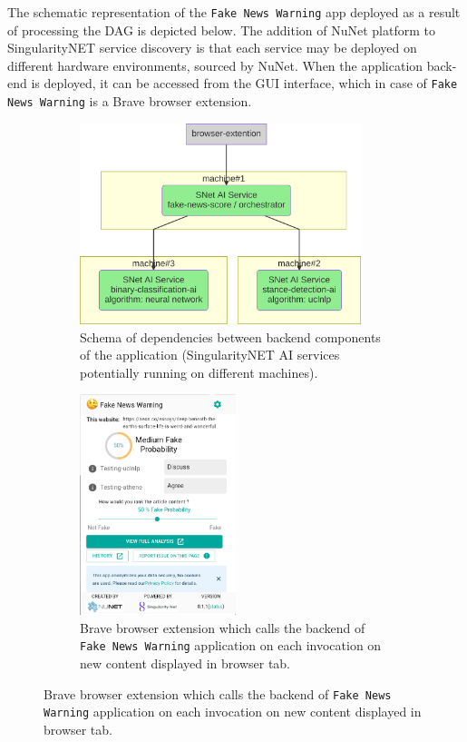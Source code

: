 \documentclass[]{report}
\begin{document}
The schematic representation of the \texttt{Fake News Warning} app deployed as a
result of processing the DAG is depicted below. The addition of NuNet platform
to SingularityNET service discovery is that each service may be deployed on
different hardware environments, sourced by NuNet. When the application back-end
is deployed, it can be accessed from the GUI interface, which in case of
\texttt{Fake News Warning} is a Brave browser extension.

\begin{figure}[H]
  \begin{subfigure}[t]{0.50\textwidth}
    \centering
    \includegraphics[width=0.9\textwidth]{../../../ontology/images/fake_news_detector.png}
    \captionsetup{width=0.8\linewidth}
    \caption{Schema of dependencies between backend components of the application
    (SingularityNET AI services potentially running on different machines).}
    \label{fig:fake_news_detector_schema}
  \end{subfigure}
  \begin{subfigure}[t]{0.50\textwidth}
    \centering
    \includegraphics[width=0.5\textwidth]{../../../ontology/images/fake_news_detector_browser_extension.png}
    \captionsetup{width=0.8\linewidth}
    \caption{Brave browser extension which calls the backend of
    \texttt{Fake News Warning} application on each invocation on new
    content displayed in browser tab.}
  \end{subfigure}
\end{figure}
\end{document}
